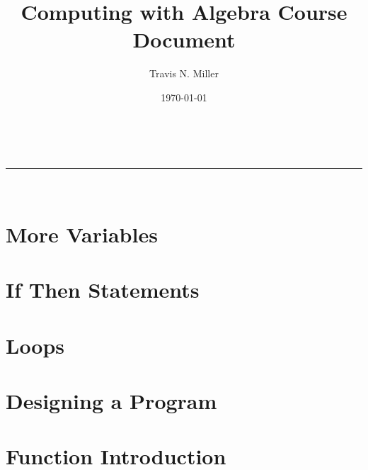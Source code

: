 \documentclass[a4paper,11pt]{article}
\makeatletter
\newcommand{\linia}{\rule{\linewidth}{0.5pt}}
\renewcommand{\maketitle}{
\begin{center}
\vspace{2ex}
{\huge \textsc{\@title}}
\vspace{1ex}
\\
\linia\\
\@author \hfill \@date
\vspace{4ex}
\end{center}
}
\makeatother
\begin{document}
\title{Computing with Algebra Course Document}

\author{Travis N. Miller}

\date{\today}

\maketitle

\section*{More Variables}


\section*{If Then Statements}


\section*{Loops}


\section*{Designing a Program}


\section*{Function Introduction}

\end{document}
